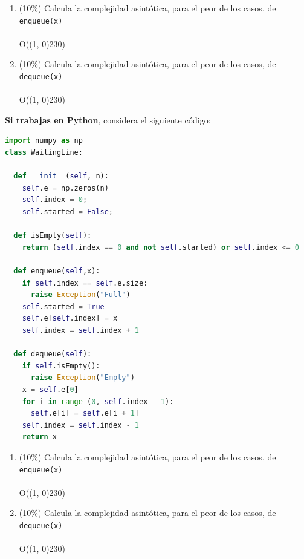 \documentclass[10 pt]{article}
\begin{document}
\begin{enumerate}[label=(\Alph*)]
  \item (10\%) Calcula la complejidad asintótica, para el peor de los casos, de 
   \texttt{enqueue(x)} \\ \\
   O(\line(1, 0){230})\\

  \item (10\%) Calcula la complejidad asintótica, para el peor de los casos, de 
   \texttt{dequeue(x)} \\ \\
   O(\line(1, 0){230})\\


\end{enumerate}

\newpage

\textbf{Si trabajas en Python}, considera el siguiente código:

\begin{lstlisting}[language = Python]
import numpy as np
class WaitingLine:

  def __init__(self, n):
    self.e = np.zeros(n)
    self.index = 0;
    self.started = False;

  def isEmpty(self): 
    return (self.index == 0 and not self.started) or self.index <= 0

  def enqueue(self,x):
    if self.index == self.e.size:
      raise Exception("Full")
    self.started = True
    self.e[self.index] = x
    self.index = self.index + 1

  def dequeue(self):
    if self.isEmpty():
      raise Exception("Empty")
    x = self.e[0]
    for i in range (0, self.index - 1):
      self.e[i] = self.e[i + 1]
    self.index = self.index - 1
    return x
\end{lstlisting}




\begin{enumerate}[label=(\Alph*)]

  \item (10\%) Calcula la complejidad asintótica, para el peor de los casos, de 
   \texttt{enqueue(x)} \\ \\
   O(\line(1, 0){230})\\

  \item (10\%) Calcula la complejidad asintótica, para el peor de los casos, de 
   \texttt{dequeue(x)} \\ \\
   O(\line(1, 0){230})\\


\end{enumerate}
\end{document}
